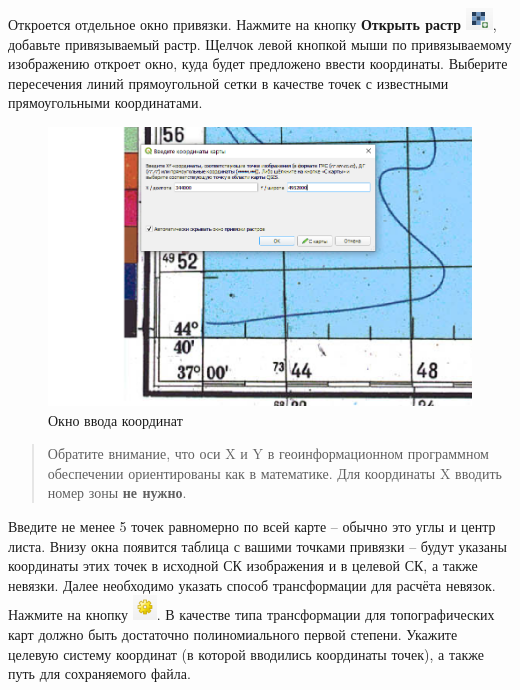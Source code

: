 \documentclass[
  12pt,
]{book}
\begin{document}
Откроется отдельное окно привязки. Нажмите на кнопку \textbf{Открыть растр} \includegraphics{images/Georeference/Open_raster.png}, добавьте привязываемый растр. Щелчок левой кнопкой мыши по привязываемому изображению откроет окно, куда будет предложено ввести координаты. Выберите пересечения линий прямоугольной сетки в качестве точек с известными прямоугольными координатами.

\begin{figure}
\centering
\includegraphics{images/Georeference/Input_coordinates.png}
\caption{Окно ввода координат}
\end{figure}

\begin{quote}
Обратите внимание, что оси X и Y в геоинформационном программном обеспечении ориентированы как в математике. Для координаты X вводить номер зоны \textbf{не нужно}.
\end{quote}

Введите не менее 5 точек равномерно по всей карте -- обычно это углы и центр листа. Внизу окна появится таблица с вашими точками привязки -- будут указаны координаты этих точек в исходной СК изображения и в целевой СК, а также невязки. Далее необходимо указать способ трансформации для расчёта невязок. Нажмите на кнопку \includegraphics{images/Georeference/Transformation_settings.png}. В качестве типа трансформации для топографических карт должно быть достаточно полиномиального первой степени. Укажите целевую систему координат (в которой вводились координаты точек), а также путь для сохраняемого файла.
\end{document}
